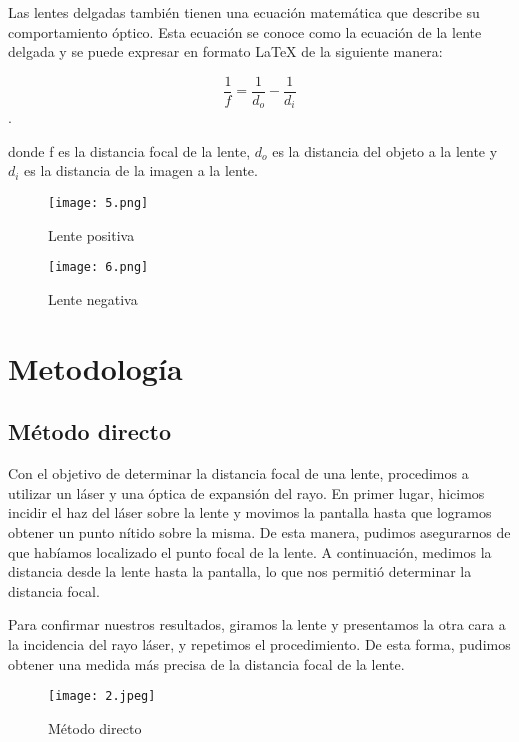 \documentclass[10pt,journal]{IEEEtran}
\begin{document}
Las lentes delgadas también tienen una ecuación matemática que describe su comportamiento óptico. Esta ecuación se conoce como la ecuación de la lente delgada y se puede expresar en formato LaTeX de la siguiente manera:

\begin{equation}
\frac{1}{f} = \frac{1}{d_o} - \frac{1}{d_i}
\end{equation}.

donde f es la distancia focal de la lente, $d_o$ es la distancia del objeto a la lente y $d_i$ es la distancia de la imagen a la lente.


\begin{figure}[!ht]
\begin {center}
\texttt{[image: 5.png]}
\caption{Lente positiva}
\end {center}
\end{figure}

\begin{figure}[!ht]
\begin {center}
\texttt{[image: 6.png]}
\caption{Lente negativa}
\end {center}
\end{figure}


\section{Metodología}


\subsection{Método directo}
Con el objetivo de determinar la distancia focal de una lente, procedimos a utilizar un láser y una óptica de expansión del rayo. En primer lugar, hicimos incidir el haz del láser sobre la lente y movimos la pantalla hasta que logramos obtener un punto nítido sobre la misma. De esta manera, pudimos asegurarnos de que habíamos localizado el punto focal de la lente. A continuación, medimos la distancia desde la lente hasta la pantalla, lo que nos permitió determinar la distancia focal.

Para confirmar nuestros resultados, giramos la lente y presentamos la otra cara a la incidencia del rayo láser, y repetimos el procedimiento. De esta forma, pudimos obtener una medida más precisa de la distancia focal de la lente.




\begin{figure}[!ht]
\begin {center}
\texttt{[image: 2.jpeg]}
\caption{Método directo}
\end {center}
\end{figure}
\end{document}
